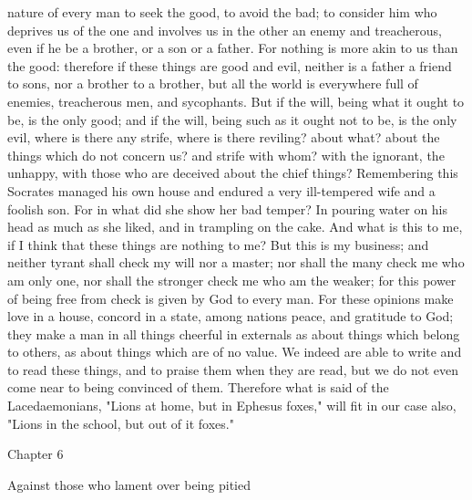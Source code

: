 \documentclass[a4paper]{article}
\begin{document}
nature of every man to seek the good, to avoid the bad; to consider him who
deprives us of the one and involves us in the other an enemy and treacherous,
even if he be a brother, or a son or a father. For nothing is more akin to us
than the good: therefore if these things are good and evil, neither is a father
a friend to sons, nor a brother to a brother, but all the world is everywhere
full of enemies, treacherous men, and sycophants. But if the will, being what
it ought to be, is the only good; and if the will, being such as it ought not
to be, is the only evil, where is there any strife, where is there reviling?
about what? about the things which do not concern us? and strife with whom?
with the ignorant, the unhappy, with those who are deceived about the chief
things?
    Remembering this Socrates managed his own house and endured a very
ill-tempered wife and a foolish son. For in what did she show her bad temper?
In pouring water on his head as much as she liked, and in trampling on the
cake. And what is this to me, if I think that these things are nothing to me?
But this is my business; and neither tyrant shall check my will nor a master;
nor shall the many check me who am only one, nor shall the stronger check me
who am the weaker; for this power of being free from check is given by God to
every man. For these opinions make love in a house, concord in a state, among
nations peace, and gratitude to God; they make a man in all things cheerful in
externals as about things which belong to others, as about things which are of
no value. We indeed are able to write and to read these things, and to praise
them when they are read, but we do not even come near to being convinced of
them. Therefore what is said of the Lacedaemonians, "Lions at home, but in
Ephesus foxes," will fit in our case also, "Lions in the school, but out of it
foxes."

Chapter 6

Against those who lament over being pitied
\end{document}
